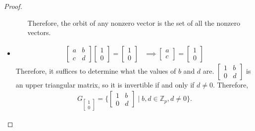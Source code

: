 \documentclass[12pt, psamsfonts]{amsart}
\theoremstyle{definition}
\theoremstyle{remark}
\numberwithin{equation}{section}
\begin{document}
\begin{proof}
\begin{itemize}
\begin{itemize}
          Therefore, the orbit of any nonzero vector is the set of all the nonzero vectors.
      \end{itemize}
    \item
      \begin{align*}
        \begin{bmatrix} a & b \\ c & d \end{bmatrix} \begin{bmatrix} 1 \\ 0 \end{bmatrix} = \begin{bmatrix} 1 \\ 0 \end{bmatrix} 
          &\implies \begin{bmatrix} a \\ c \end{bmatrix} = \begin{bmatrix} 1 \\ 0 \end{bmatrix} 
      \end{align*}
      Therefore, it suffices to determine what the values of $b$ and $d$ are.
      $\begin{bmatrix} 1 & b \\ 0 & d \end{bmatrix}$ is an upper triangular matrix, so it is invertible if and only if $d \ne 0$.
      Therefore,
      \begin{align*}
        G_{\begin{bmatrix} 1 \\ 0 \end{bmatrix}} = \{ \begin{bmatrix} 1 & b \\ 0 & d \end{bmatrix} \mid b, d \in \mathbb{Z}_p, d \ne 0 \}.
      \end{align*}
  \end{itemize}
\end{proof}
\end{document}

